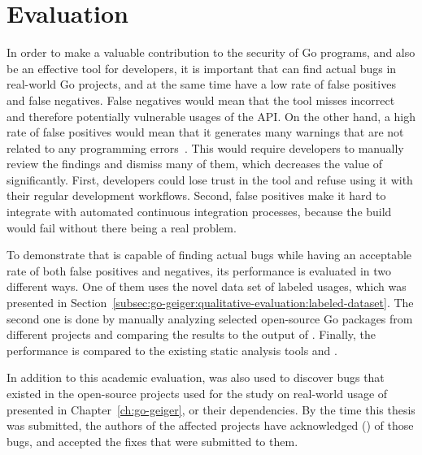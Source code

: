 \section{Evaluation}\label{sec:go-safer:evaluation}

In order to make a valuable contribution to the security of Go programs, and also be an effective tool for developers,
it is important that \toolSafer{} can find actual bugs in real-world Go projects, and at the same time have a low rate
of false positives and false negatives.
False negatives would mean that the tool misses incorrect and therefore potentially vulnerable usages of the \unsafe{}
\acrshort{API}.
On the other hand, a high rate of false positives would mean that it generates many warnings that are not related to
any programming errors~\cite{banerjee2009}.
This would require developers to manually review the findings and dismiss many of them, which decreases the value of
\toolSafer{} significantly.
First, developers could lose trust in the tool and refuse using it with their regular development workflows.
Second, false positives make it hard to integrate \toolSafer{} with automated continuous integration processes, because
the build would fail without there being a real problem.

To demonstrate that \toolSafer{} is capable of finding actual bugs while having an acceptable rate of both false
positives and negatives, its performance is evaluated in two different ways.
One of them uses the novel data set of labeled \unsafe{} usages, which was presented in
Section~\ref{subsec:go-geiger:qualitative-evaluation:labeled-dataset}.
The second one is done by manually analyzing  selected open-source Go packages from different projects and
comparing the results to the output of \toolSafer{}.
Finally, the performance is compared to the existing static analysis tools \toolVet{} and \toolGosec{}.

In addition to this academic evaluation, \toolSafer{} was also used to discover \numberBugsFixed{} bugs that existed in
the open-source projects used for the study on real-world usage of \unsafe{} presented in Chapter~\ref{ch:go-geiger}, or
their dependencies.
By the time this thesis was submitted, the authors of the affected projects have acknowledged \numberBugsMerged{}
(\fractionBugsMerged{}) of those bugs, and accepted the fixes that were submitted to them.



